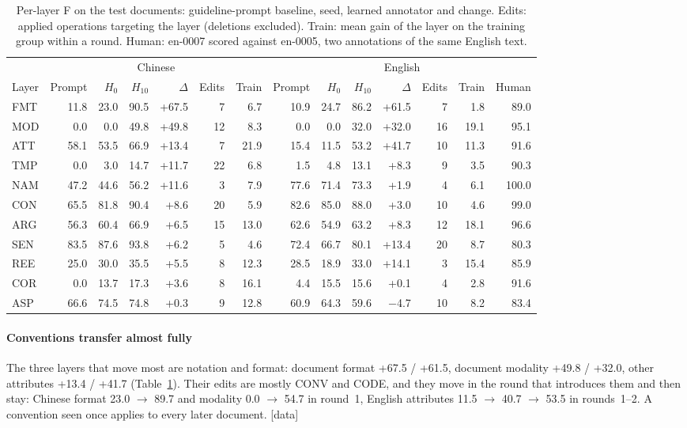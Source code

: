 \documentclass[11pt]{article}
\newcommand{\stag}[2]{\textcolor{#1}{\textsf{\scriptsize[#2]}}}
\newcommand{\HAVE}{\stag{green!50!black}{data}\xspace}
\begin{document}
\begin{table}[t]
\centering\small
\setlength{\tabcolsep}{3.5pt}
\begin{tabular}{@{}l|rrrrrr|rrrrrrr@{}}
\toprule
& \multicolumn{6}{c|}{Chinese} & \multicolumn{7}{c}{English} \\
Layer & Prompt & $H_0$ & $H_{10}$ & $\Delta$ & Edits & Train & Prompt & $H_0$ & $H_{10}$ & $\Delta$ & Edits & Train & Human \\
\midrule
FMT & 11.8 & 23.0 & 90.5 & +67.5 & 7 & 6.7 & 10.9 & 24.7 & 86.2 & +61.5 & 7 & 1.8 & 89.0 \\
MOD & 0.0 & 0.0 & 49.8 & +49.8 & 12 & 8.3 & 0.0 & 0.0 & 32.0 & +32.0 & 16 & 19.1 & 95.1 \\
ATT & 58.1 & 53.5 & 66.9 & +13.4 & 7 & 21.9 & 15.4 & 11.5 & 53.2 & +41.7 & 10 & 11.3 & 91.6 \\
TMP & 0.0 & 3.0 & 14.7 & +11.7 & 22 & 6.8 & 1.5 & 4.8 & 13.1 & +8.3 & 9 & 3.5 & 90.3 \\
NAM & 47.2 & 44.6 & 56.2 & +11.6 & 3 & 7.9 & 77.6 & 71.4 & 73.3 & +1.9 & 4 & 6.1 & 100.0 \\
CON & 65.5 & 81.8 & 90.4 & +8.6 & 20 & 5.9 & 82.6 & 85.0 & 88.0 & +3.0 & 10 & 4.6 & 99.0 \\
ARG & 56.3 & 60.4 & 66.9 & +6.5 & 15 & 13.0 & 62.6 & 54.9 & 63.2 & +8.3 & 12 & 18.1 & 96.6 \\
SEN & 83.5 & 87.6 & 93.8 & +6.2 & 5 & 4.6 & 72.4 & 66.7 & 80.1 & +13.4 & 20 & 8.7 & 80.3 \\
REE & 25.0 & 30.0 & 35.5 & +5.5 & 8 & 12.3 & 28.5 & 18.9 & 33.0 & +14.1 & 3 & 15.4 & 85.9 \\
COR & 0.0 & 13.7 & 17.3 & +3.6 & 8 & 16.1 & 4.4 & 15.5 & 15.6 & +0.1 & 4 & 2.8 & 91.6 \\
ASP & 66.6 & 74.5 & 74.8 & +0.3 & 9 & 12.8 & 60.9 & 64.3 & 59.6 & $-$4.7 & 10 & 8.2 & 83.4 \\
\bottomrule
\end{tabular}
\caption{Per-layer F on the test documents: guideline-prompt baseline, seed, learned annotator and change. Edits: applied operations targeting the layer (deletions excluded). Train: mean gain of the layer on the training group within a round. Human: en-0007 scored against en-0005, two annotations of the same English text.}
\label{tab:layerresults}
\end{table}

\paragraph{Conventions transfer almost fully}
The three layers that move most are notation and format: document format +67.5 / +61.5, document modality +49.8 / +32.0, other attributes +13.4 / +41.7 (Table~\ref{tab:layerresults}). Their edits are mostly CONV and CODE, and they move in the round that introduces them and then stay: Chinese format 23.0 $\rightarrow$ 89.7 and modality 0.0 $\rightarrow$ 54.7 in round~1, English attributes 11.5 $\rightarrow$ 40.7 $\rightarrow$ 53.5 in rounds~1--2. A convention seen once applies to every later document. \HAVE
\end{document}
